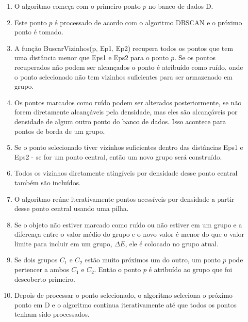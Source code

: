 \begin{enumerate}
	\item O algoritmo começa com o primeiro ponto ${p}$ no banco de dados D.
	\item Este ponto ${p}$ é processado de acordo com o algoritmo DBSCAN e o próximo ponto é tomado.
	\item A função BuscarVizinhos(p, Ep1, Ep2) recupera todos os pontos que tem uma distância menor que Eps1 e Eps2 para o ponto ${p}$. Se os pontos recuperados não podem ser alcançados o ponto é atribuído como ruído, onde o ponto selecionado não tem vizinhos suficientes para ser armazenado em grupo.
	\item Os pontos marcados como ruído podem ser alterados posteriormente, se não forem diretamente alcançáveis pela densidade, mas eles são alcançáveis por densidade de algum outro ponto do banco de dados. Isso acontece para pontos de borda de um grupo.
	\item Se o ponto selecionado tiver vizinhos suficientes dentro das distâncias Eps1 e Eps2 - se for um ponto central, então um novo grupo será construído.
	\item Todos os vizinhos diretamente atingíveis por densidade desse ponto central também são incluídos.
	\item O algoritmo reúne iterativamente pontos acessíveis por densidade a partir desse ponto central usando uma pilha.
	\item Se o objeto não estiver marcado como ruído ou não estiver em um grupo e a diferença entre o valor médio do grupo e o novo valor é menor do que o valor limite para incluir em um grupo, ${\Delta E}$, ele é colocado no grupo atual.
	\item Se dois grupos ${C_1}$ e ${C_2}$ estão muito próximos um do outro, um ponto ${p}$ pode pertencer a ambos ${C_1}$ e ${C_2}$. Então o ponto ${p}$ é atribuído ao grupo que foi descoberto primeiro.
	\item Depois de processar o ponto selecionado, o algoritmo seleciona o próximo ponto em D e o algoritmo continua iterativamente até que todos os pontos tenham sido processados.
\end{enumerate}

